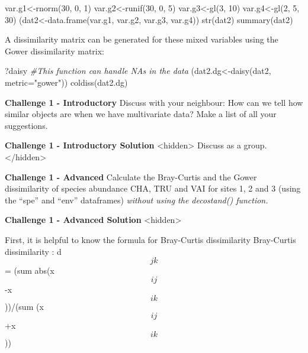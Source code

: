 \documentclass[
]{book}
\newenvironment{Shaded}{\begin{snugshade}}{\end{snugshade}}
\newcommand{\AttributeTok}[1]{\textcolor[rgb]{0.77,0.63,0.00}{#1}}
\newcommand{\CommentTok}[1]{\textcolor[rgb]{0.56,0.35,0.01}{\textit{#1}}}
\newcommand{\DecValTok}[1]{\textcolor[rgb]{0.00,0.00,0.81}{#1}}
\newcommand{\FunctionTok}[1]{\textcolor[rgb]{0.00,0.00,0.00}{#1}}
\newcommand{\NormalTok}[1]{#1}
\newcommand{\OtherTok}[1]{\textcolor[rgb]{0.56,0.35,0.01}{#1}}
\newcommand{\StringTok}[1]{\textcolor[rgb]{0.31,0.60,0.02}{#1}}
\begin{document}
\begin{Shaded}
\begin{Highlighting}[]
\NormalTok{var.g1}\OtherTok{\textless{}{-}}\FunctionTok{rnorm}\NormalTok{(}\DecValTok{30}\NormalTok{, }\DecValTok{0}\NormalTok{, }\DecValTok{1}\NormalTok{)}
\NormalTok{var.g2}\OtherTok{\textless{}{-}}\FunctionTok{runif}\NormalTok{(}\DecValTok{30}\NormalTok{, }\DecValTok{0}\NormalTok{, }\DecValTok{5}\NormalTok{)}
\NormalTok{var.g3}\OtherTok{\textless{}{-}}\FunctionTok{gl}\NormalTok{(}\DecValTok{3}\NormalTok{, }\DecValTok{10}\NormalTok{)}
\NormalTok{var.g4}\OtherTok{\textless{}{-}}\FunctionTok{gl}\NormalTok{(}\DecValTok{2}\NormalTok{, }\DecValTok{5}\NormalTok{, }\DecValTok{30}\NormalTok{)}
\NormalTok{(dat2}\OtherTok{\textless{}{-}}\FunctionTok{data.frame}\NormalTok{(var.g1, var.g2, var.g3, var.g4))}
\FunctionTok{str}\NormalTok{(dat2)}
\FunctionTok{summary}\NormalTok{(dat2)}
\end{Highlighting}
\end{Shaded}

A dissimilarity matrix can be generated for these mixed variables using
the Gower dissimilarity matrix:

\begin{Shaded}
\begin{Highlighting}[]
\NormalTok{?daisy }\CommentTok{\#This function can handle NAs in the data}
\NormalTok{(dat2.dg}\OtherTok{\textless{}{-}}\FunctionTok{daisy}\NormalTok{(dat2, }\AttributeTok{metric=}\StringTok{"gower"}\NormalTok{))}
\FunctionTok{coldiss}\NormalTok{(dat2.dg)}
\end{Highlighting}
\end{Shaded}

\textbf{Challenge 1 - Introductory} Discuss with your neighbour: How can we
tell how similar objects are when we have multivariate data? Make a list
of all your suggestions.

\textbf{Challenge 1 - Introductory Solution} \textless hidden\textgreater{} Discuss as a group.
\textless/hidden\textgreater{}

\textbf{Challenge 1 - Advanced} Calculate the Bray-Curtis and the Gower
dissimilarity of species abundance CHA, TRU and VAI for sites 1, 2 and 3
(using the ``spe'' and ``env'' dataframes) \emph{without using the decostand()
function.}

\textbf{Challenge 1 - Advanced Solution} \textless hidden\textgreater{}

First, it is helpful to know the formula for Bray-Curtis dissimilarity
Bray-Curtis dissimilarity : d\[jk\] = (sum abs(x\[ij\]-x\[ik\]))/(sum
(x\[ij\]+x\[ik\]))
\end{document}
